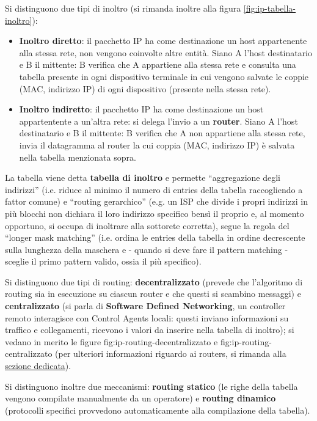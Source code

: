 \documentclass[11pt, italian, openany]{book}
\begin{document}
\begin{sloppypar}
Si distinguono due tipi di inoltro (si rimanda inoltre alla figura \ref{fig:ip-tabella-inoltro}):
\begin{itemize}[itemsep=0pt, parsep=0pt, topsep=0pt]
	\item \textbf{Inoltro diretto}: il pacchetto IP ha come destinazione un host appartenente alla stessa rete, non vengono coinvolte altre entit\`a. Siano
	A l'host destinatario e B il mittente: B verifica che A appartiene alla stessa rete e consulta una tabella presente in ogni dispositivo terminale
	in cui vengono salvate le coppie (MAC, indirizzo IP) di ogni dispositivo (presente nella stessa rete).
	\item \textbf{Inoltro indiretto}: il pacchetto IP ha come destinazione un host appartentente a un'altra rete: si delega l'invio a un \textbf{router}. Siano
	A l'host destinatario e B il mittente: B verifica che A non appartiene alla stessa rete, invia il datagramma al router la cui coppia (MAC, indirizzo IP)
	\`e salvata nella tabella menzionata sopra.
\end{itemize}
La tabella viene detta \textbf{tabella di inoltro} e permette ``aggregazione degli indirizzi'' (i.e. riduce al minimo il numero di entries della tabella
raccogliendo a fattor comune) e ``routing gerarchico'' (e.g. un ISP che divide i propri indirizzi in pi\`u blocchi non dichiara il loro indirizzo specifico
bens\`i il proprio e, al momento opportuno, si occupa di inoltrare alla sottorete corretta), segue la regola del ``longer mask matching'' (i.e. ordina le
entries della tabella in ordine decrescente sulla lunghezza della maschera e - quando si deve fare il pattern matching - sceglie il primo pattern valido,
ossia il pi\`u specifico).

Si distinguono due tipi di routing: \textbf{decentralizzato} (prevede che l'algoritmo di routing sia in esecuzione su ciascun router e che questi si scambino
messaggi) e \textbf{centralizzato} (si parla di \textbf{Software Defined Networking}, un controller remoto interagisce con Control Agents locali: questi
inviano informazioni su traffico e collegamenti, ricevono i valori da inserire nella tabella di inoltro); si vedano in merito le figure
fig:ip-routing-decentralizzato e fig:ip-routing-centralizzato (per ulteriori informazioni riguardo ai routers, si rimanda alla
\hyperref[Routers]{\underline{sezione dedicata}}).

Si distinguono inoltre due meccanismi: \textbf{routing statico} (le righe della tabella vengono compilate manualmente da un operatore) e
\textbf{routing dinamico} (protocolli specifici provvedono automaticamente alla compilazione della tabella).


\end{sloppypar}
\end{document}
